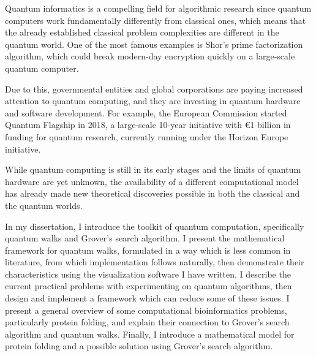 Quantum informatics is a compelling field for algorithmic research since quantum computers work fundamentally differently from classical ones, which means that the already established classical problem complexities are different in the quantum world. One of the most famous examples is Shor's prime factorization algorithm, which could break modern-day encryption quickly on a large-scale quantum computer.

Due to this, governmental entities and global corporations are paying increased attention to quantum computing, and they are investing in quantum hardware and software development. For example, the European Commission started Quantum Flagship in 2018, a large-scale 10-year initiative with €1 billion in funding for quantum research, currently running under the Horizon Europe initiative.

While quantum computing is still in its early stages and the limits of quantum hardware are yet unknown, the availability of a different computational model has already made new theoretical discoveries possible in both the classical and the quantum worlds.

In my dissertation, I introduce the toolkit of quantum computation, specifically quantum walks and Grover's search algorithm. I present the mathematical framework for quantum walks, formulated in a way which is less common in literature, from which implementation follows naturally, then demonstrate their characteristics using the visualization software I have written. I describe the current practical problems with experimenting on quantum algorithms, then design and implement a framework which can reduce some of these issues. I present a general overview of some computational bioinformatics problems, particularly protein folding, and explain their connection to Grover's search algorithm and quantum walks. Finally, I introduce a mathematical model for protein folding and a possible solution using Grover's search algorithm.

\vfill
\selectthesislanguage

\setcounter{romanPage}{\value{page}}
